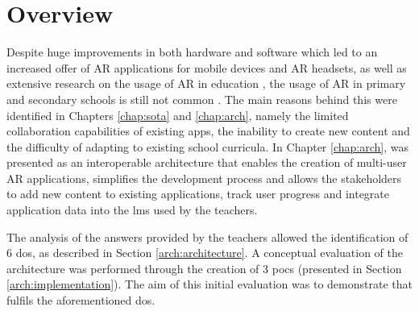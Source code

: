 \section{Overview}\label{eval:introduction}

Despite huge improvements in both hardware and software which led to an increased offer of AR applications for mobile devices and AR headsets, as well as extensive research on the usage of AR in education \citep{7943075, akccayir2017advantages, chen2017new, ibanez2018augmented, pellas2019augmenting, 10.3897/jucs.76535}, the usage of AR in primary and secondary schools is still not common \citep{doi/10.2759/121671}.
The main reasons behind this were identified in Chapters \ref{chap:sota} and \ref{chap:arch}, namely the limited collaboration capabilities of existing apps, the inability to create new content and the difficulty of adapting to existing school curricula.
In Chapter \ref{chap:arch}, \arch{} was presented as an interoperable architecture that enables the creation of multi-user AR applications, simplifies the development process and allows the stakeholders to add new content to existing applications, track user progress and integrate application data into the \gls{lms} used by the teachers.

The analysis of the answers provided by the teachers allowed the identification of 6 \glspl{do}, as described in Section \ref{arch:architecture}. A conceptual evaluation of the \arch{} architecture was performed through the creation of 3 \glspl{poc} (presented in Section \ref{arch:implementation}). The aim of this initial evaluation was to demonstrate that \arch{} fulfils the aforementioned \glspl{do}.

 
